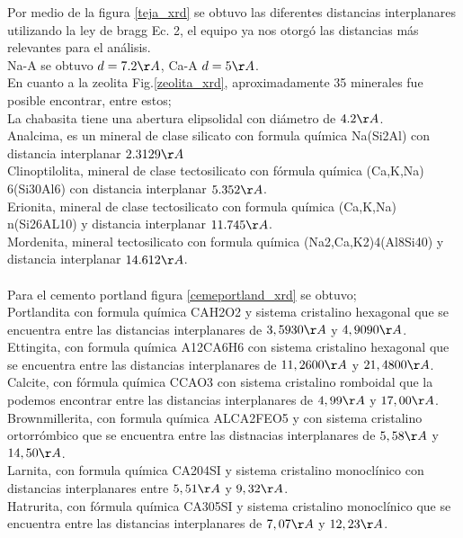 \documentclass[a4paper, 11pt]{article}
\begin{document}
Por medio de la figura \ref{teja_xrd} se obtuvo las diferentes distancias interplanares utilizando la ley de bragg Ec. 2, el equipo ya nos otorgó las distancias más relevantes para el análisis. \\
Na-A se obtuvo $d=7.2\AA$, Ca-A $d=5\AA$.\\
En cuanto a la zeolita Fig.\ref{zeolita_xrd}, aproximadamente 35 minerales fue posible encontrar, entre estos;\\
La chabasita tiene una abertura elipsolidal con diámetro de $4.2 \AA$.\\
Analcima, es un mineral de clase silicato con formula química Na(Si2Al) con distancia interplanar $2.3129 \AA$\\
Clinoptilolita, mineral de clase tectosilicato con fórmula química (Ca,K,Na)\\6(Si30Al6) con distancia interplanar $5.352\AA$.\\
Erionita, mineral de clase tectosilicato con formula química (Ca,K,Na)\\n(Si26AL10) y distancia interplanar $11.745\AA$.\\
Mordenita, mineral tectosilicato con formula química (Na2,Ca,K2)4(Al8Si40) y distancia interplanar $14.612\AA$.
\\
\\
Para el cemento portland figura \ref{cemeportland_xrd} se obtuvo;\\
Portlandita con formula química CAH2O2 y sistema cristalino hexagonal que se encuentra entre las distancias interplanares de $3,5930\AA$ y $4,9090\AA$.\\
Ettingita, con formula química A12CA6H6 con sistema cristalino hexagonal que se encuentra entre las distancias interplanares de $11,2600\AA$ y $21,4800\AA$.\\
Calcite, con fórmula química CCAO3 con sistema cristalino romboidal que la podemos encontrar entre las distancias interplanares de $4,99\AA$ y $17,00\AA$.\\
Brownmillerita, con formula química ALCA2FEO5 y con sistema cristalino ortorrómbico que se encuentra entre las distnacias interplanares de $5,58\AA$ y $14,50\AA$.\\
Larnita, con formula química CA204SI y sistema cristalino monoclínico con distancias interplanares entre $5,51\AA$ y $9,32\AA$.\\
Hatrurita, con fórmula química CA305SI y sistema cristalino monoclínico que se encuentra entre las distancias interplanares de $7,07\AA$ y $12,23\AA$.\\
\end{document}
